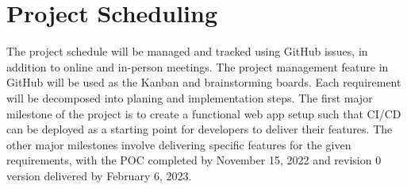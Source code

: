 \documentclass{article}
\begin{document}
\section{Project Scheduling}


The project schedule will be managed and tracked using GitHub issues, in
addition to online and in-person meetings. The project management feature in
GitHub will be used as the Kanban and brainstorming boards. Each requirement
will be decomposed into planing and implementation steps. The first major
milestone of the project is to create a functional web app setup such that
CI/CD can be deployed as a starting point for developers to deliver their
features. The other major milestones involve delivering specific features for
the given requirements, with the POC completed by November 15, 2022 and
revision 0 version delivered by February 6, 2023.
\end{document}
